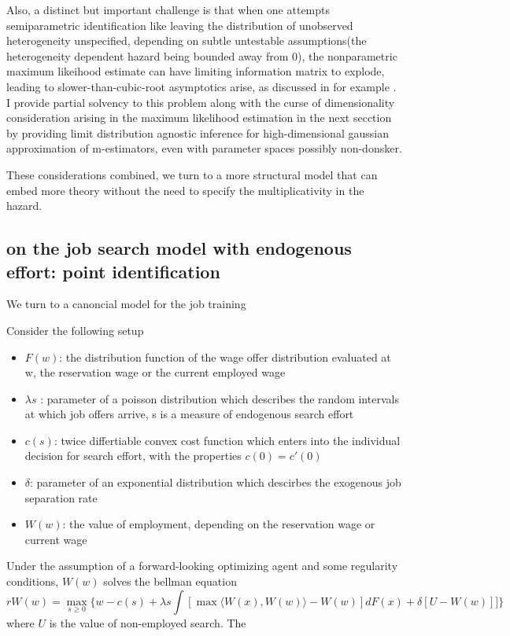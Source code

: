 \documentclass[uplatex,dvipdfmx]{jsarticle}
\begin{document}
Also, a distinct but important challenge is that when one attempts semiparametric identification like leaving the distribution of unobserved heterogeneity unspecified, depending on subtle untestable assumptions(the heterogeneity dependent hazard being bounded away from 0), the nonparametric maximum likeihood estimate can have 
limiting information matrix to explode, leading to
 slower-than-cubic-root asymptotics arise, as discussed in for example \cite{hahn1994efficiency,ridder2003singularity}. I provide partial solvency to this problem along with the curse of dimensionality consideration arising in the maximum likelihood estimation in the next secction by providing limit distribution agnostic inference for 
high-dimensional gaussian approximation of m-estimators, even with parameter spaces possibly non-donsker. 

These considerations combined, we turn to a more structural model that can embed more theory without the need to specify the multiplicativity in the hazard.
\subsection{on the job search model with endogenous effort: point identification}
We turn to a canoncial model for the job training 


Consider the following setup
\begin{itemize}
    \item $F(w)$: the distribution function of the wage offer distribution evaluated at w, the reservation wage or the current employed wage
    \item $\lambda s$ : parameter of a poisson distribution which describes the random intervals at which job offers arrive, s is a measure of endogenous search effort
    \item $c(s)$: twice differtiable convex cost function which enters into the individual decision for search effort, with the properties $c(0)=c'(0)$
    \item $\delta$: parameter of an exponential distribution which descirbes the exogenous job separation rate
    \item $W(w)$: the value of employment, depending on the reservation wage or current wage
\end{itemize}
Under the assumption of a forward-looking optimizing agent and some regularity conditions, $W(w)$ solves the bellman equation
\begin{equation}
    r W(w) = \max_{s \geq 0} \{ w - c(s) + \lambda s \int [ \max \langle W(x), W(w) \rangle  - W(w) ] dF(x) + \delta [ U - W(w)] ] \}
\end{equation}
where $U$ is the value of non-employed search. 
The 
\end{document}

